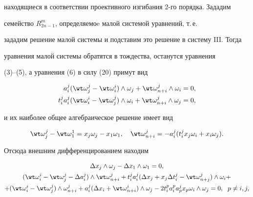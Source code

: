 находящиеся в соответствии проективного изгибания 2-го порядка. Зададим 


семейство $R^m_{2n-1}$, определяемоe малой системой уравнений, т.\,е. 


зададим решение малой системы и подставим это решение в систему III. Тогда 


уравнения малой системы обратятся в тождества, останутся уравнения


(3)--(5), а уравнения (6) в силу (20) примут вид 


\begin{align*} 


a^j_i(\wt\omega^j_j-\wt\omega^i_i)\wedge 


\omega_j+\wt\omega^j_{n+i}\wedge\omega_i&=0,\\ 


t^j_i a^j_i(\wt\omega^i_i-\wt\omega^j_j)\wedge 


\omega_i+\wt\omega^j_{n+i}\wedge\omega_j&=0, 


\end{align*} 


и их наиболее общее алгебраическое решение имеет вид 


\begin{equation} 


\wt\omega^j_j-\wt\omega^1_1=x_j\omega_j-x_1\omega_1,\quad 


\wt\omega^j_{n+i}=-a^j_i(t^j_i x_j\omega_i+x_i\omega_j). 


\end{equation} 


Отсюда внешним дифференцированием находим 


\begin{gather} 


\Delta x_j\wedge\omega_j-\Delta x_1\wedge\omega_1=0,\notag\\ 


% 


(\wt\omega^i_i-\wt\omega^j_j-\Delta a^j_i)\wedge 


\wt\omega^j_{n+i}+t^j_i a^j_i(\Delta x_j+x_j \Delta 


t^j_i-\wt\omega^j_{n+j})\wedge\omega_i+ \\ 


% 


+(\wt\omega^i_i-\wt\omega^j_j)\wedge\omega^j_{n+i}+ 


a^j_i(\Delta x_i+\wt\omega^i_{n+i})\wedge\omega_j- 


2t^p_i a^p_i a^j_p x_p\omega_i\wedge\omega_j=0, 


\ \; p\ne i,j,\notag 


\end{gather} 


